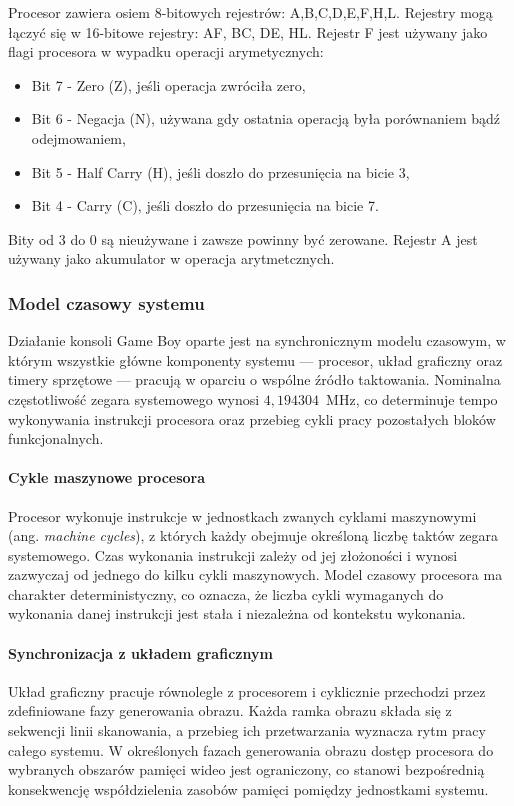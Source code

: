 \documentclass{article}
\begin{document}
Procesor zawiera osiem 8-bitowych rejestrów: A,B,C,D,E,F,H,L. Rejestry mogą łączyć się w 16-bitowe rejestry: AF, BC, DE, HL. Rejestr F jest używany jako flagi procesora w wypadku operacji arymetycznych:
\begin{itemize}
	\item Bit 7 - Zero (Z), jeśli operacja zwróciła zero,
	\item Bit 6 -  Negacja (N), używana gdy ostatnia operacją była porównaniem bądź odejmowaniem,
	\item Bit 5 - Half Carry (H), jeśli doszło do przesunięcia na bicie 3,
	\item Bit 4 - Carry (C), jeśli doszło do przesunięcia na bicie 7.
\end{itemize} 
Bity od 3 do 0 są nieużywane i zawsze powinny być zerowane. Rejestr A jest używany jako akumulator w operacja arytmetcznych.
\subsubsection{Model czasowy systemu}

Działanie konsoli Game Boy oparte jest na synchronicznym modelu czasowym, w którym wszystkie główne komponenty systemu --- procesor, układ graficzny oraz timery sprzętowe --- pracują w oparciu o wspólne źródło taktowania. Nominalna częstotliwość zegara systemowego wynosi $4{,}194304$~MHz, co determinuje tempo wykonywania instrukcji procesora oraz przebieg cykli pracy pozostałych bloków funkcjonalnych.

\paragraph{Cykle maszynowe procesora}

Procesor wykonuje instrukcje w jednostkach zwanych cyklami maszynowymi (ang. \emph{machine cycles}), z których każdy obejmuje określoną liczbę taktów zegara systemowego. Czas wykonania instrukcji zależy od jej złożoności i wynosi zazwyczaj od jednego do kilku cykli maszynowych. Model czasowy procesora ma charakter deterministyczny, co oznacza, że liczba cykli wymaganych do wykonania danej instrukcji jest stała i niezależna od kontekstu wykonania.

\paragraph{Synchronizacja z układem graficznym}

Układ graficzny pracuje równolegle z procesorem i cyklicznie przechodzi przez zdefiniowane fazy generowania obrazu. Każda ramka obrazu składa się z sekwencji linii skanowania, a przebieg ich przetwarzania wyznacza rytm pracy całego systemu. W określonych fazach generowania obrazu dostęp procesora do wybranych obszarów pamięci wideo jest ograniczony, co stanowi bezpośrednią konsekwencję współdzielenia zasobów pamięci pomiędzy jednostkami systemu.
\end{document}
